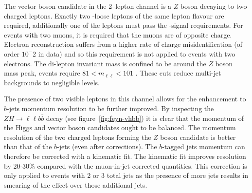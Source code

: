 The vector boson candidate in the 2--lepton channel is a $Z$ boson decaying to
two charged leptons. Exactly two \VH-loose leptons of the same lepton flavour
are required, additionally one of the leptons must pass the \ZH-signal
requirements. For events with two muons, it is required that the muons are of
opposite charge. Electron reconstruction suffers from a higher rate of charge
misidentification (of order $10^-2$ in data) and so this requirement is not
applied to events with two electrons. The di-lepton invariant mass is confined
to be around the $Z$ boson mass peak, events require $81 < m_{\ell\ell} < 101$
\GeV. These cuts reduce multi-jet backgrounds to negligible levels.

The presence of two visible leptons in this channel allows for the enhancement
to $b$-jets momentum resolution to be further improved. By inspecting the $Z\!H\!
\to\! \ell\ell b\bar{b}$ decay (see figure~\ref{fig:feyn-vhbb}) it is clear that
the momentum of the Higgs and vector boson candidates ought to be balanced. The
momentum resolution of the two charged leptons forming the $Z$ boson candidate
is better than that of the $b$-jets (even after corrections). The $b$-tagged
jets momentum can therefore be corrected with a kinematic fit. The kinematic fit
improves resolution by 20-30\% compared with the muon-in-jet corrected
quantities. This correction is only applied to events with 2 or 3 total jets as
the presence of more jets results in smearing of the effect over those
additional jets.
